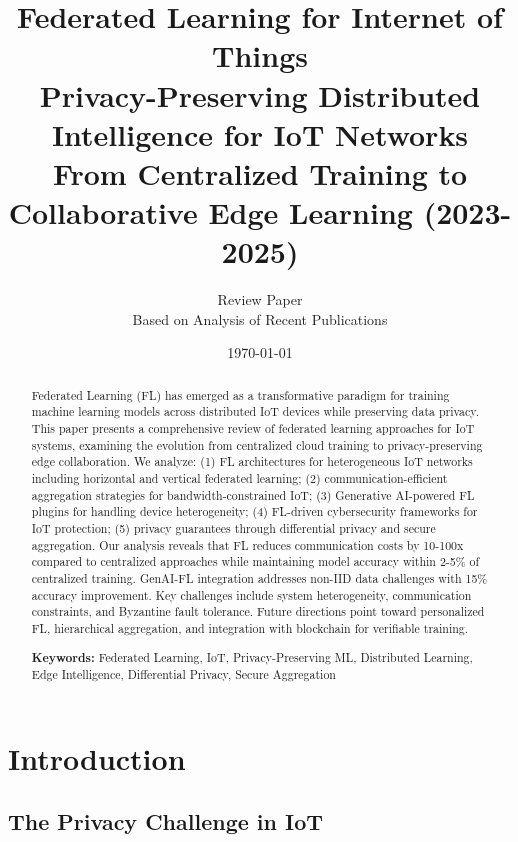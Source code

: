 \documentclass[12pt,a4paper]{article}
\title{
\vspace{-1cm}
{\Huge\bfseries Federated Learning for Internet of Things}\\[0.5cm]
{\Large Privacy-Preserving Distributed Intelligence for IoT Networks}\\[0.3cm]
{\large From Centralized Training to Collaborative Edge Learning (2023-2025)}
}
\author{
\large Review Paper\\[0.2cm]
\normalsize Based on Analysis of Recent Publications
}
\date{\today}
\begin{document}
\maketitle
\thispagestyle{empty}

\begin{abstract}
\noindent
Federated Learning (FL) has emerged as a transformative paradigm for training machine learning models across distributed IoT devices while preserving data privacy. This paper presents a comprehensive review of federated learning approaches for IoT systems, examining the evolution from centralized cloud training to privacy-preserving edge collaboration. We analyze: (1) FL architectures for heterogeneous IoT networks including horizontal and vertical federated learning; (2) communication-efficient aggregation strategies for bandwidth-constrained IoT; (3) Generative AI-powered FL plugins for handling device heterogeneity; (4) FL-driven cybersecurity frameworks for IoT protection; (5) privacy guarantees through differential privacy and secure aggregation. Our analysis reveals that FL reduces communication costs by 10-100x compared to centralized approaches while maintaining model accuracy within 2-5\% of centralized training. GenAI-FL integration addresses non-IID data challenges with 15\% accuracy improvement. Key challenges include system heterogeneity, communication constraints, and Byzantine fault tolerance. Future directions point toward personalized FL, hierarchical aggregation, and integration with blockchain for verifiable training.

\vspace{0.3cm}
\noindent\textbf{Keywords:} Federated Learning, IoT, Privacy-Preserving ML, Distributed Learning, Edge Intelligence, Differential Privacy, Secure Aggregation
\end{abstract}

\newpage
\tableofcontents
\newpage

\section{Introduction}

\subsection{The Privacy Challenge in IoT}
\end{document}
